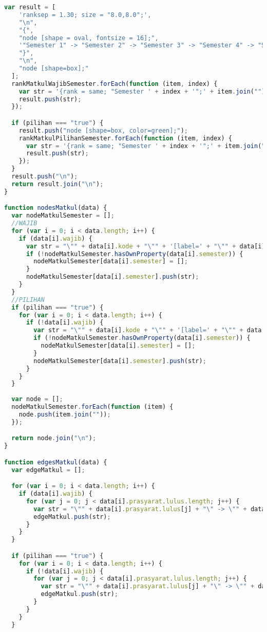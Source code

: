\begin{lstlisting}[language=Javascript, caption=indexs.js]
  var result = [
    'ranksep = 1.30; size = "8.0,8.0";',
    "\n",
    "{",
    "node [shape = oval, fontsize = 16];",
    '"Semester 1" -> "Semester 2" -> "Semester 3" -> "Semester 4" -> "Semester 5" -> "Semester 6" -> "Semester 7" -> "Semester 8";',
    "}",
    "\n",
    "node [shape=box];"
  ];
  rankMatkulWajibSemester.forEach(function (item, index) {
    var str = '{rank = same; "Semester ' + index + '";' + item.join("") + '}';
    result.push(str);
  });

  if (pilihan === "true") {
    result.push("node [shape=box, color=green];");
    rankMatkulPilihanSemester.forEach(function (item, index) {
      var str = '{rank = same; "Semester ' + index + '";' + item.join("") + '}';
      result.push(str);
    });
  }
  result.push("\n");
  return result.join("\n");
}

function nodesMatkul(data) {
  var nodeMatkulSemester = [];
  //WAJIB
  for (var i = 0; i < data.length; i++) {
    if (data[i].wajib) {
      var str = "\"" + data[i].kode + "\"" + '[label=' + "\"" + data[i].kode + "-0" + data[i].sks + "\n" + data[i].nama + "\"" + ']';
      if (!nodeMatkulSemester.hasOwnProperty(data[i].semester)) {
        nodeMatkulSemester[data[i].semester] = [];
      }
      nodeMatkulSemester[data[i].semester].push(str);
    }
  }
  //PILIHAN
  if (pilihan === "true") {
    for (var i = 0; i < data.length; i++) {
      if (!data[i].wajib) {
        var str = "\"" + data[i].kode + "\"" + '[label=' + "\"" + data[i].kode + "-0" + data[i].sks + "\n" + data[i].nama + "\"" + ']';
        if (!nodeMatkulSemester.hasOwnProperty(data[i].semester)) {
          nodeMatkulSemester[data[i].semester] = [];
        }
        nodeMatkulSemester[data[i].semester].push(str);
      }
    }
  }
  
  var node = [];
  nodeMatkulSemester.forEach(function (item) {
    node.push(item.join(""));
  });

  return node.join("\n");
}

function edgesMatkul(data) {
  var edgeMatkul = [];

  for (var i = 0; i < data.length; i++) {
    if (data[i].wajib) {
      for (var j = 0; j < data[i].prasyarat.lulus.length; j++) {
        var str = "\"" + data[i].prasyarat.lulus[j] + "\" -> \"" + data[i].kode + "\"";
        edgeMatkul.push(str);
      }
    }
  }

  if (pilihan === "true") {
    for (var i = 0; i < data.length; i++) {
      if (!data[i].wajib) {
        for (var j = 0; j < data[i].prasyarat.lulus.length; j++) {
          var str = "\"" + data[i].prasyarat.lulus[j] + "\" -> \"" + data[i].kode + "\"";
          edgeMatkul.push(str);
        }
      }
    }
  }
  

\end{lstlisting}
